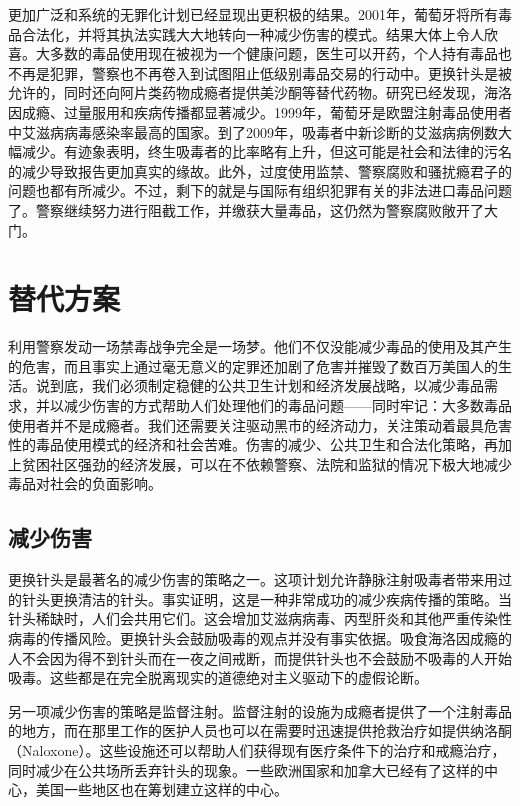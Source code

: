 \documentclass[fontset=fandol, a4paper, 12pt, openright]{ctexbook}
\begin{document}
更加广泛和系统的无罪化计划已经显现出更积极的结果。2001年，葡萄牙将所有毒品合法化，并将其执法实践大大地转向一种减少伤害的模式。结果大体上令人欣喜。大多数的毒品使用现在被视为一个健康问题，医生可以开药，个人持有毒品也不再是犯罪，警察也不再卷入到试图阻止低级别毒品交易的行动中。更换针头是被允许的，同时还向阿片类药物成瘾者提供美沙酮等替代药物。研究已经发现，海洛因成瘾、过量服用和疾病传播都显著减少。1999年，葡萄牙是欧盟注射毒品使用者中艾滋病病毒感染率最高的国家。到了2009年，吸毒者中新诊断的艾滋病病例数大幅减少。有迹象表明，终生吸毒者的比率略有上升，但这可能是社会和法律的污名的减少导致报告更加真实的缘故。此外，过度使用监禁、警察腐败和骚扰瘾君子的问题也都有所减少。不过，剩下的就是与国际有组织犯罪有关的非法进口毒品问题了。警察继续努力进行阻截工作，并缴获大量毒品，这仍然为警察腐败敞开了大门。

\section{替代方案}

利用警察发动一场禁毒战争完全是一场梦。他们不仅没能减少毒品的使用及其产生的危害，而且事实上通过毫无意义的定罪还加剧了危害并摧毁了数百万美国人的生活。说到底，我们必须制定稳健的公共卫生计划和经济发展战略，以减少毒品需求，并以减少伤害的方式帮助人们处理他们的毒品问题——同时牢记：大多数毒品使用者并不是成瘾者。我们还需要关注驱动黑市的经济动力，关注策动着最具危害性的毒品使用模式的经济和社会苦难。伤害的减少、公共卫生和合法化策略，再加上贫困社区强劲的经济发展，可以在不依赖警察、法院和监狱的情况下极大地减少毒品对社会的负面影响。

\subsection{减少伤害}
更换针头是最著名的减少伤害的策略之一。这项计划允许静脉注射吸毒者带来用过的针头更换清洁的针头。事实证明，这是一种非常成功的减少疾病传播的策略。当针头稀缺时，人们会共用它们。这会增加艾滋病病毒、丙型肝炎和其他严重传染性病毒的传播风险。更换针头会鼓励吸毒的观点并没有事实依据。吸食海洛因成瘾的人不会因为得不到针头而在一夜之间戒断，而提供针头也不会鼓励不吸毒的人开始吸毒。这些都是在完全脱离现实的道德绝对主义驱动下的虚假论断。

另一项减少伤害的策略是监督注射。监督注射的设施为成瘾者提供了一个注射毒品的地方，而在那里工作的医护人员也可以在需要时迅速提供抢救治疗如提供纳洛酮（Naloxone）。这些设施还可以帮助人们获得现有医疗条件下的治疗和戒瘾治疗，同时减少在公共场所丢弃针头的现象。一些欧洲国家和加拿大已经有了这样的中心，美国一些地区也在筹划建立这样的中心。
\end{document}
